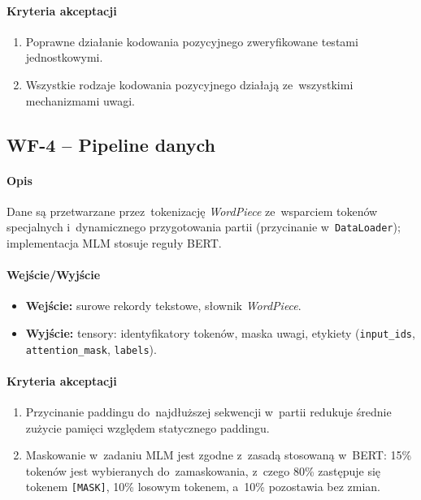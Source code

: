 \documentclass[a4paper,11pt,twoside]{report}
\theoremstyle{definition}
\begin{document}
\paragraph{Kryteria akceptacji}
\begin{enumerate}
  \item Poprawne działanie kodowania pozycyjnego zweryfikowane testami jednostkowymi.
  \item Wszystkie rodzaje kodowania pozycyjnego działają ze~wszystkimi mechanizmami uwagi.
\end{enumerate}

\subsection{WF-4 -- Pipeline danych}
\paragraph{Opis} Dane są przetwarzane przez~tokenizację \textit{WordPiece} ze~wsparciem tokenów specjalnych i~dynamicznego przygotowania partii (przycinanie w~\texttt{DataLoader}); implementacja MLM stosuje reguły BERT.

\paragraph{Wejście/Wyjście}
\begin{itemize}
  \item \textbf{Wejście:} surowe rekordy tekstowe, słownik \textit{WordPiece}.
  \item \textbf{Wyjście:} tensory: identyfikatory tokenów, maska uwagi, etykiety (\texttt{input\_ids}, \texttt{attention\_mask}, \texttt{labels}).
\end{itemize}

\paragraph{Kryteria akceptacji}
\begin{enumerate}
  \item Przycinanie paddingu do~najdłuższej sekwencji w~partii redukuje średnie zużycie pamięci względem statycznego paddingu.
  \item Maskowanie w~zadaniu MLM jest zgodne z~zasadą stosowaną w~BERT: 15\% tokenów jest wybieranych do~zamaskowania, z~czego 80\% zastępuje się tokenem \texttt{[MASK]}, 10\% losowym tokenem, a~10\% pozostawia bez zmian.
\end{enumerate}
\end{document}
